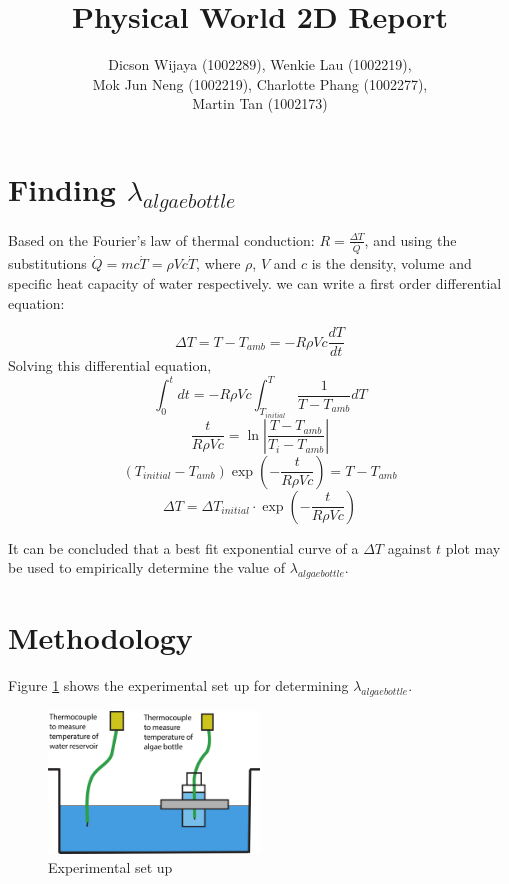 \documentclass[10pt,a4paper]{IEEEtran}
\author{Dicson Wijaya (1002289), Wenkie Lau (1002219), \\ Mok Jun Neng (1002219), Charlotte Phang (1002277),\\ Martin Tan (1002173)}
\title{Physical World 2D Report}
\begin{document}
	\maketitle
	\section{Finding $\lambda_{algae bottle}$}
	Based on the Fourier's law of thermal conduction: $R = \frac{\Delta T}{\dot{Q}}$, and using the substitutions $\dot{Q} = mc \dot{T} = \rho V c \dot{T}$, where $\rho$, $V$ and $c$ is the density, volume and specific heat capacity of water respectively. we can write a first order differential equation:
		
	$$\Delta T = T - T_{amb} = -R \rho V c \frac{dT}{dt}$$
	Solving this differential equation,
	$$\int_{0}^{t} dt = -R \rho V c \int_{T_{initial}}^{T}\frac{1}{T-T_{amb}} dT$$
	$$\frac{t}{R \rho V c} = \ln \left| \frac{T - T_{amb}}{T_i - T_{amb}} \right|$$
	$$\left( T_{initial} - T_{amb} \right) \exp(-\frac{t}{R \rho V c}) = T - T_{amb}$$
	$$\Delta T = \Delta T_{initial} \cdot \exp(-\frac{t}{R \rho V c})$$
	
	It can be concluded that a best fit exponential curve of a $\Delta T$ against $t$ plot may be used to empirically determine the value of $\lambda_{algae bottle}$.
	\section{Methodology}
	Figure \ref{fig:methodology} shows the experimental set up for determining $\lambda_{algae bottle}$.
	
 	\begin{figure}[H]
 		\begin{center}
 			\includegraphics[width=0.5\textwidth]{methodology.png}
 			\caption{Experimental set up}
 			\label{fig:methodology}
 		\end{center}
 	\end{figure} 
	
\end{document}
